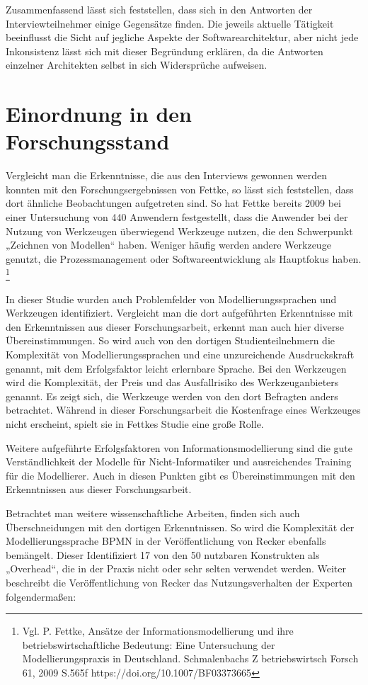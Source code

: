 Zusammenfassend lässt sich feststellen, dass sich in den Antworten der Interviewteilnehmer einige Gegensätze finden. Die jeweils aktuelle Tätigkeit beeinflusst die Sicht auf jegliche Aspekte der Softwarearchitektur, aber nicht jede Inkonsistenz lässt sich mit dieser Begründung erklären, da die Antworten einzelner Architekten selbst in sich Widersprüche aufweisen.

\section{Einordnung in den Forschungsstand}

Vergleicht man die Erkenntnisse, die aus den Interviews gewonnen werden konnten mit den Forschungsergebnissen von Fettke, so lässt sich feststellen, dass dort ähnliche Beobachtungen aufgetreten sind. So hat Fettke bereits 2009 bei einer Untersuchung von 440 Anwendern festgestellt, dass die Anwender bei der Nutzung von Werkzeugen überwiegend Werkzeuge nutzen, die den Schwerpunkt „Zeichnen von Modellen“ haben. Weniger häufig werden andere Werkzeuge genutzt, die Prozessmanagement oder Softwareentwicklung als Hauptfokus haben. \footnote{Vgl. P. Fettke, Ansätze der Informationsmodellierung und ihre betriebswirtschaftliche Bedeutung: Eine Untersuchung der Modellierungspraxis in Deutschland. Schmalenbachs Z betriebswirtsch Forsch 61, 2009 S.565f  https://doi.org/10.1007/BF03373665} 

In dieser Studie wurden auch Problemfelder von Modellierungssprachen und Werkzeugen identifiziert. Vergleicht man die dort aufgeführten Erkenntnisse mit den Erkenntnissen aus dieser Forschungsarbeit, erkennt man auch hier diverse Übereinstimmungen. So wird auch von den dortigen Studienteilnehmern die Komplexität von Modellierungssprachen und eine unzureichende Ausdruckskraft genannt, mit dem Erfolgsfaktor leicht erlernbare Sprache. Bei den Werkzeugen wird die Komplexität, der Preis und das Ausfallrisiko des Werkzeuganbieters genannt. Es zeigt sich, die Werkzeuge werden von den dort Befragten anders betrachtet. Während in dieser Forschungsarbeit die Kostenfrage eines Werkzeuges nicht erscheint, spielt sie in Fettkes Studie eine große Rolle. 

Weitere aufgeführte Erfolgsfaktoren von Informationsmodellierung sind die gute Verständlichkeit der Modelle für Nicht-Informatiker und ausreichendes Training für die Modellierer. Auch in diesen Punkten gibt es Übereinstimmungen mit den Erkenntnissen aus dieser Forschungsarbeit.

Betrachtet man weitere wissenschaftliche Arbeiten, finden sich auch Überschneidungen mit den dortigen Erkenntnissen. So wird die Komplexität der Modellierungssprache BPMN in der Veröffentlichung von Recker ebenfalls bemängelt. Dieser Identifiziert 17 von den 50 nutzbaren Konstrukten als „Overhead“, die in der Praxis nicht oder sehr selten verwendet werden.
Weiter beschreibt die Veröffentlichung von Recker das Nutzungsverhalten der Experten folgendermaßen:

